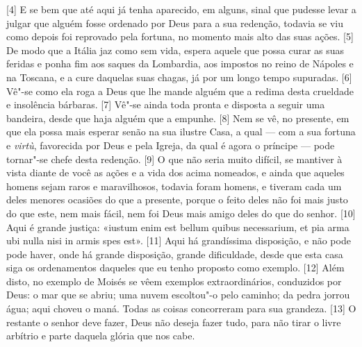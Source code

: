 {[}4{]} E se bem que até aqui já tenha aparecido, em alguns, sinal que
pudesse levar a julgar que alguém fosse ordenado por Deus para a sua
redenção, todavia se viu como depois foi reprovado pela fortuna, no
momento mais alto das suas ações. {[}5{]} De modo que a Itália jaz como sem vida, espera
aquele que possa curar as suas feridas e ponha fim aos saques da
Lombardia, aos impostos no reino de Nápoles e na Toscana, e a cure
daquelas suas chagas, já por um longo tempo supuradas. {[}6{]} Vê"-se
como ela roga a Deus que lhe mande alguém que a redima desta crueldade e
insolência bárbaras. {[}7{]} Vê"-se ainda toda pronta e disposta a seguir
uma bandeira, desde que haja alguém que a empunhe. {[}8{]} Nem se vê, no
presente, em que ela possa mais esperar senão na sua ilustre
Casa, a qual --- com a sua
fortuna e \emph{virtù}, favorecida por Deus e pela Igreja, da qual é
agora o príncipe
--- pode tornar"-se chefe desta redenção. {[}9{]} O que não seria muito
difícil, se mantiver à vista diante de você as ações e a vida dos acima
nomeados, e ainda que aqueles homens
sejam raros e maravilhosos, todavia foram homens, e tiveram cada um
deles menores ocasiões do que a presente, porque o feito deles não foi
mais justo do que este, nem mais fácil, nem foi Deus mais amigo deles do
que do senhor. {[}10{]} Aqui é grande justiça: «iustum enim est bellum
quibus necessarium, et pia arma ubi nulla nisi in armis spes
est». {[}11{]} Aqui há grandíssima disposição, e não pode pode
haver, onde há grande disposição, grande dificuldade, desde que esta
casa siga os ordenamentos daqueles que eu tenho proposto como exemplo.
{[}12{]} Além disto, no exemplo de Moisés se vêem exemplos
extraordinários, conduzidos por Deus: o mar que se abriu; uma nuvem
escoltou"-o pelo caminho; da pedra jorrou água; aqui choveu o maná. Todas
as coisas concorreram para sua grandeza. {[}13{]} O restante o senhor
deve fazer, Deus não deseja fazer tudo, para não tirar o livre arbítrio
e parte daquela glória que nos cabe.

